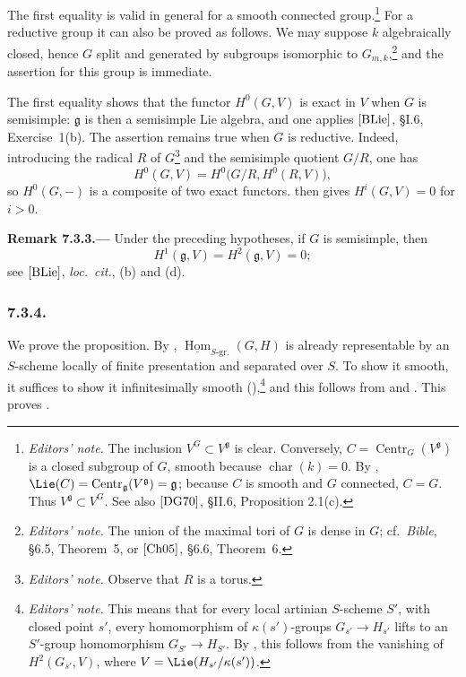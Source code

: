 The first equality is valid in general for a smooth connected
group.\footnote{\textit{Editors' note.} The inclusion
\(V^G\subset V^{\mathfrak g}\) is clear. Conversely,
\(C=\operatorname{Centr}_G(V^{\mathfrak g})\) is a closed subgroup of
\(G\), smooth because \(\operatorname{char}(k)=0\). By ,
\(\Lie(C)=\operatorname{Centr}_{\mathfrak g}(V^{\mathfrak g})
=\mathfrak g\); because \(C\) is smooth and \(G\) connected, \(C=G\).
Thus \(V^{\mathfrak g}\subset V^G\). See also \([{\rm DG70}]\),
\S II.6, Proposition 2.1(c).} For a reductive group it can also be
proved as follows. We may suppose \(k\) algebraically closed, hence
\(G\) split and generated by subgroups isomorphic to
\(G_{m,k}\),\footnote{\textit{Editors' note.} The union of the maximal
tori of \(G\) is dense in \(G\); cf.\ \emph{Bible}, \S6.5,
Theorem~5, or \([{\rm Ch05}]\), \S6.6, Theorem~6.} and the assertion
for this group is immediate.

The first equality shows that the functor \(H^0(G,V)\) is exact in
\(V\) when \(G\) is semisimple: \(\mathfrak g\) is then a semisimple
Lie algebra, and one applies \([{\rm BLie}]\), \S I.6,
Exercise~1(b). The assertion remains true when \(G\) is reductive.
Indeed, introducing the radical \(R\) of
\(G\)\footnote{\textit{Editors' note.} Observe that \(R\) is a torus.}
and the semisimple quotient \(G/R\), one has
\[
  H^0(G,V)=H^0\bigl(G/R,H^0(R,V)\bigr),
\]
so \(H^0(G,-)\) is a composite of two exact functors. 
then gives \(H^i(G,V)=0\) for \(i>0\).

\par\medskip\noindent{}\textbf{Remark 7.3.3.---}\enspace
Under the preceding hypotheses, if \(G\) is semisimple, then
\[
  H^1(\mathfrak g,V)=H^2(\mathfrak g,V)=0;
\]
see \([{\rm BLie}]\), \emph{loc.\ cit.}, (b) and (d).

\subsubsection*{7.3.4.}

We prove the proposition. By ,
\(\underline{\operatorname{Hom}}_{S\text{-}\mathrm{gr.}}(G,H)\) is
already representable by an \(S\)-scheme locally of finite
presentation and separated over \(S\). To show it smooth, it suffices
to show it infinitesimally smooth (),\footnote{\textit{Editors' note.} This means that for every local
artinian \(S\)-scheme \(S'\), with closed point \(s'\), every
homomorphism of \(\kappa(s')\)-groups
\(G_{s'}\to H_{s'}\) lifts to an \(S'\)-group homomorphism
\(G_{S'}\to H_{S'}\). By , this follows from the
vanishing of \(H^2(G_{s'},V)\), where
\(V=\Lie(H_{s'}/\kappa(s'))\).} and this follows from  and . This proves .

